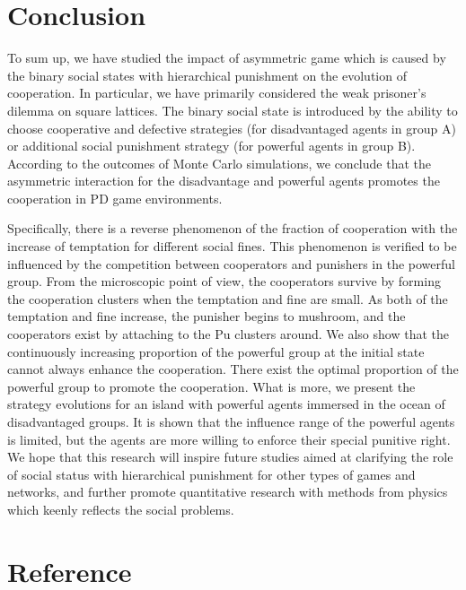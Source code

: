 \documentclass[%
 aip,
 amsmath,amssymb,
 reprint,%
]{revtex4-1}
\begin{document}
\section{\label{sec:level1}Conclusion}
To sum up, we have studied the impact of asymmetric game which is caused by the binary social states with hierarchical punishment on the evolution of cooperation. In particular, we have primarily considered the weak prisoner's dilemma on square lattices. The binary social state is introduced by the ability to choose cooperative and defective strategies (for disadvantaged agents in group A) or additional social punishment strategy (for powerful agents in group B). According to the outcomes of Monte Carlo simulations, we conclude that the asymmetric interaction for the disadvantage and powerful agents promotes the cooperation in PD game environments.

Specifically, there is a reverse phenomenon of the fraction of cooperation with the increase of temptation for different social fines. This phenomenon is verified to be influenced by the competition between cooperators and punishers in the powerful group. From the microscopic point of view, the cooperators survive by forming the cooperation clusters when the temptation and fine are small. As both of the temptation and fine increase, the punisher begins to mushroom, and the cooperators exist by attaching to the Pu clusters around. We also show that the continuously increasing proportion of the powerful group at the initial state cannot always enhance the cooperation. There exist the optimal proportion of the powerful group to promote the cooperation. What is more, we present the strategy evolutions for an island with powerful agents immersed in the ocean of disadvantaged groups. It is shown that the influence range of the powerful agents is limited, but the agents are more willing to enforce their special punitive right. We hope that this research will inspire future studies aimed at clarifying the role of social status with hierarchical punishment for other types of games and networks, and further promote quantitative research with methods from physics which keenly reflects the social problems.

\section{\label{sec:level1}Reference}
\end{document}
